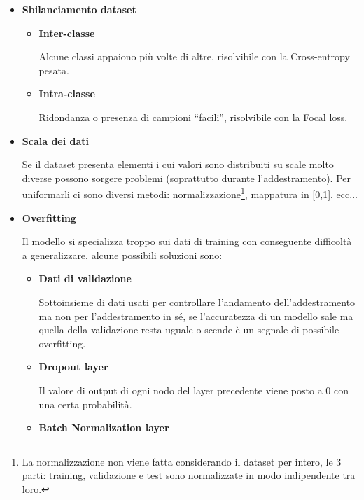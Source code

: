 \documentclass{article}
\begin{document}
\begin{itemize}
    \item \textbf{Sbilanciamento dataset}

        \begin{itemize}
            \item \textbf{Inter-classe}

                Alcune classi appaiono più volte di altre, risolvibile con la Cross-entropy pesata.
            
            \item \textbf{Intra-classe}

                Ridondanza o presenza di campioni ``facili'', risolvibile con la Focal loss.
            
        \end{itemize}

    \item \textbf{Scala dei dati}

        Se il dataset presenta elementi i cui valori sono distribuiti su scale molto diverse possono sorgere problemi (soprattutto durante l'addestramento). Per uniformarli ci sono diversi metodi: normalizzazione\footnote{La normalizzazione non viene fatta considerando il dataset per intero, le 3 parti: training, validazione e test sono normalizzate in modo indipendente tra loro.}, mappatura in [0,1], ecc...
    
    \item \textbf{Overfitting}

        Il modello si specializza troppo sui dati di training con conseguente difficoltà a generalizzare, alcune possibili soluzioni sono:

        \begin{itemize}
            \item \textbf{Dati di validazione}

                Sottoinsieme di dati usati per controllare l'andamento dell'addestramento ma non per l'addestramento in sé, se l'accuratezza di un modello sale ma quella della validazione resta uguale o scende è un segnale di possibile overfitting. 
            
            \item \textbf{Dropout layer}

                Il valore di output di ogni nodo del layer precedente viene posto a 0 con una certa probabilità.
            
            \item \textbf{Batch Normalization layer}


\end{itemize}
\end{itemize}
\end{document}
